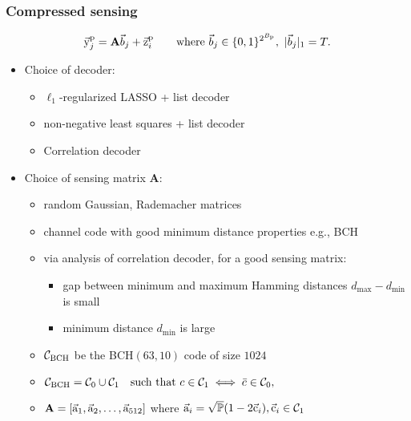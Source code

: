 \begin{frame}\frametitle{Compressed sensing}
{\footnotesize
	\begin{align*}
	\vec{\mathrm{y}}^{\mathrm{p}}_j	=\mathbf{A}\vec{b}_j+\vec{\mathrm{z}}^{\mathrm{p}}_i \qquad \text{where }\vec{b}_j\in\{0,1\}^{2^{B_{\mathrm{p}}}},~ |\vec{b}_j|_1=T.
	\end{align*}
	}
	\vspace{-3ex}
\begin{itemize}
\item Choice of decoder:
	\begin{itemize}
		\item $\ell_1$-regularized LASSO + list decoder
		\item non-negative least squares + list decoder
		\item Correlation decoder
	\end{itemize}
\pause
\item Choice of sensing matrix $\mathbf{A}$:
	\begin{itemize}
		\item random Gaussian, Rademacher matrices
		\pause
		\item channel code with good minimum distance properties e.g., BCH
		\item via analysis of correlation decoder, for a good sensing matrix:		
			\begin{itemize}
				 \item gap between minimum and maximum Hamming distances $d_{\max}-d_{\min}$ is small
				 \item minimum distance $d_{\min}$ is large
			\end{itemize}
	\item $\mathcal{C}_{\text{BCH}}$ be the BCH$(63,10)$ code of size $1024$
	\item $\mathcal{C}_{\text{BCH}}=\mathcal{C}_0\cup \mathcal{C}_1 ~~\text{ such that } c\in \mathcal{C}_1 \iff \bar{c}\in\mathcal{C}_0,$
	\item $\mathbf{A}=[\vec{\mathrm{a}}_1,\vec{\mathrm{a}}_2,\ldots,\vec{\mathrm{a}}_{512}]$ where $\vec{\mathrm{a}}_i=\sqrt{\mathbb{P}}(1-2\vec{\mathrm{c}}_i), \vec{\mathrm{c}}_i\in\mathcal{C}_1$%
	\end{itemize}

\end{itemize}
\end{frame}

